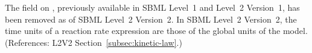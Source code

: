 The  field on \Reaction, previously available in
SBML Level~1 and Level~2 Version~1, has been removed as of SBML
Level~2 Version~2.  In SBML Level~2 Version~2, the time units of a
reaction rate expression are those of the global  units
of the model.  (References: L2V2
Section~\ref{subsec:kinetic-law}.)
